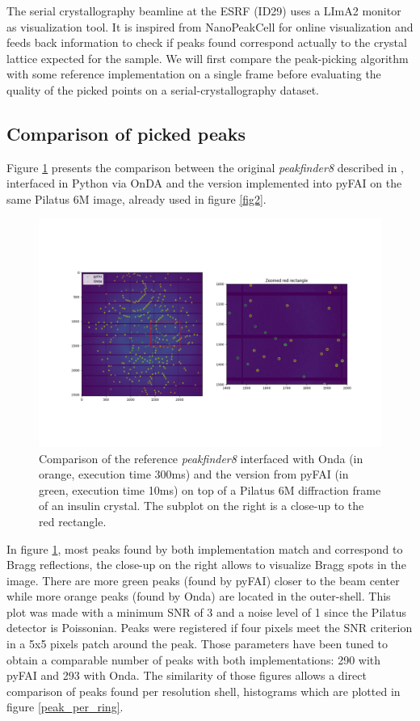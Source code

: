 \documentclass[preprint]{iucr}              %
\begin{document}
The serial crystallography beamline at the ESRF (ID29) uses a LImA2 monitor \cite{lima2} as visualization tool.
It is inspired from  NanoPeakCell \cite{nanopeakcell} for online visualization and feeds back information to check if peaks found correspond actually to the crystal lattice expected for the sample.
We will first compare the peak-picking algorithm with some reference implementation on a single frame before evaluating the quality of the picked points on a serial-crystallography dataset.

\subsection{Comparison of picked peaks}
Figure \ref{peakfinder} presents the comparison between the original \textit{peakfinder8} described in , interfaced in Python via OnDA \cite{onda} and the version implemented into pyFAI on the same Pilatus 6M image, already used in figure \ref{fig2}. 

\begin{figure}
\label{peakfinder}
\includegraphics[width=12cm]{peakfinder}
\caption{Comparison of the reference \textit{peakfinder8} interfaced with Onda (in orange, execution time 300ms) and the version from pyFAI (in green, execution time 10ms) on top of a Pilatus 6M diffraction frame of an insulin crystal.
The subplot on the right is a close-up to the red rectangle.}
\end{figure}

In figure \ref{peakfinder}, most peaks found by both implementation match and correspond to Bragg reflections, the close-up on the right allows to visualize Bragg spots in the image.
There are more green peaks (found by pyFAI) closer to the beam center while more orange peaks (found by Onda) are located in the outer-shell.
This plot was made with a minimum SNR of 3 and a noise level of 1 since the Pilatus detector is Poissonian.
Peaks were registered if four pixels meet the SNR criterion in a 5x5 pixels patch around the peak.
Those parameters have been tuned to obtain a comparable number of peaks with both implementations: 290 with pyFAI and 293 with Onda.
The similarity of those figures allows a direct comparison of peaks found per resolution shell, histograms which are plotted in figure \ref{peak_per_ring}.
\end{document}
